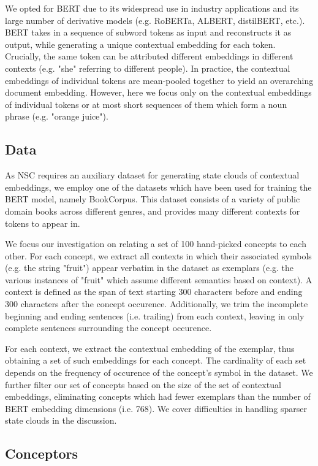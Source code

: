 We opted for BERT due to its widespread use in industry applications and its large number of derivative models (e.g. RoBERTa, ALBERT, distilBERT, etc.). BERT takes in a sequence of subword tokens as input and reconstructs it as output, while generating a unique contextual embedding for each token. Crucially, the same token can be attributed different embeddings in different contexts (e.g. "she" referring to different people). In practice, the contextual embeddings of individual tokens are mean-pooled together to yield an overarching document embedding. However, here we focus only on the contextual embeddings of individual tokens or at most short sequences of them which form a noun phrase (e.g. "orange juice").

\subsection{Data}

As NSC requires an auxiliary dataset for generating state clouds of contextual embeddings, we employ one of the datasets which have been used for training the BERT model, namely BookCorpus. This dataset consists of a variety of public domain books across different genres, and provides many different contexts for tokens to appear in.

We focus our investigation on relating a set of 100 hand-picked concepts to each other. For each concept, we extract all contexts in which their associated symbols (e.g. the string "fruit") appear verbatim in the dataset as exemplars (e.g. the various instances of "fruit" which assume different semantics based on context). A context is defined as the span of text starting 300 characters before and ending 300 characters after the concept occurence. Additionally, we trim the incomplete beginning and ending sentences (i.e. trailing) from each context, leaving in only complete sentences surrounding the concept occurence.

For each context, we extract the contextual embedding of the exemplar, thus obtaining a set of such embeddings for each concept. The cardinality of each set depends on the frequency of occurence of the concept's symbol in the dataset. We further filter our set of concepts based on the size of the set of contextual embeddings, eliminating concepts which had fewer exemplars than the number of BERT embedding dimensions (i.e. 768). We cover difficulties in handling sparser state clouds in the discussion.

\subsection{Conceptors}

